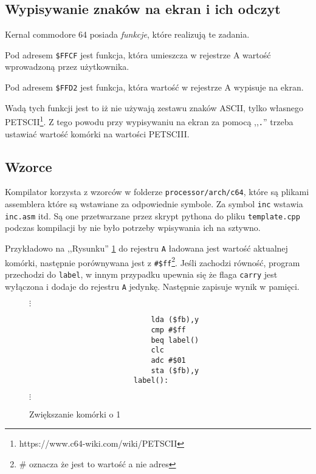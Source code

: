 \documentclass[a4paper,12pt]{article}
\begin{document}
    \subsection*{Wypisywanie znaków na ekran i ich odczyt}

    Kernal commodore 64 posiada \emph{funkcje}, które realizują te zadania.

    Pod adresem \texttt{\$FFCF} jest funkcja, która umieszcza w rejestrze A wartość wprowadzoną przez użytkownika.

    Pod adresem \texttt{\$FFD2} jest funkcja, która wartość w rejestrze A wypisuje na ekran.

    Wadą tych funkcji jest to iż nie używają zestawu znaków ASCII, tylko własnego PETSCII\footnote{https://www.c64-wiki.com/wiki/PETSCII}. Z tego powodu przy wypisywaniu na ekran za pomocą ,,\texttt{.}'' trzeba ustawiać wartość komórki na wartości PETSCIII.

    \subsection*{Wzorce}

    Kompilator korzysta z wzorców w folderze \texttt{processor/arch/c64}, które są plikami assemblera które są wstawiane za odpowiednie symbole. Za symbol \texttt{inc} wstawia \texttt{inc.asm} itd. Są one przetwarzane przez skrypt pythona do pliku \texttt{template.cpp} podczas kompilacji by nie było potrzeby wpisywania ich na sztywno.
    
    Przykładowo na ,,Rysunku'' \ref{kod:inc} do rejestru \texttt{A} ładowana jest wartość aktualnej komórki, następnie porównywana jest z \texttt{\#\$ff}\footnote{\# oznacza że jest to wartość a nie adres}. Jeśli zachodzi równość, program przechodzi do \texttt{label}, w innym przypadku upewnia się że flaga \texttt{carry} jest wyłączona i dodaje do rejestru \texttt{A} jedynkę. Następnie zapisuje wynik w pamięci.

    \begin{figure}[h]
        $\vdots$
        \centering
        \begin{lstlisting}
                            lda ($fb),y
                            cmp #$ff
                            beq label()
                            clc
                            adc #$01
                            sta ($fb),y
                        label():
        \end{lstlisting}
        $\vdots$
        \centering
        \caption{Zwiększanie komórki o 1}
        \label{kod:inc}
    \end{figure}
    
\end{document}
